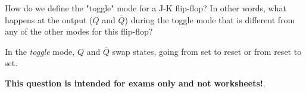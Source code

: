 

How do we define the "toggle" mode for a J-K flip-flop?  In other words, what happens at the output ($Q$ and $\overline{Q}$) during the toggle mode that is different from any of the other modes for this flip-flop?







In the {\it toggle} mode, $Q$ and $\overline{Q}$ swap states, going from set to reset or from reset to set.







{\bf This question is intended for exams only and not worksheets!}.




